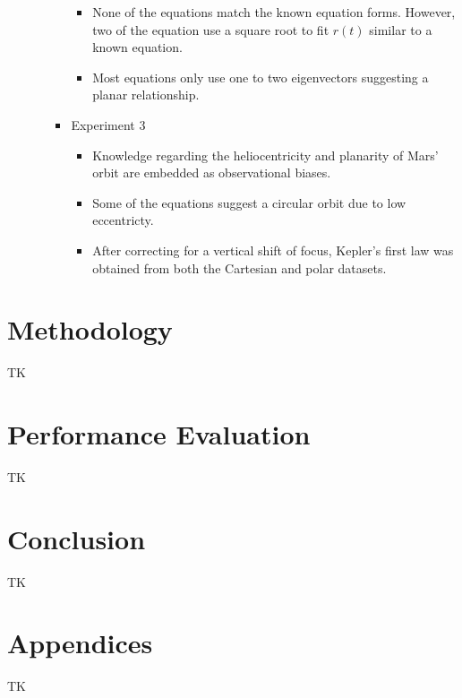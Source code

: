 \documentclass[fleqn,10pt]{olplainarticle}
\begin{document}
\begin{itemize}
\begin{itemize}
\begin{itemize}
\begin {itemize}
                                \item None of the equations match the known equation forms. However, two of the equation use a square root to fit $r(t)$ similar to a known equation.
                                \item Most equations only use one to two eigenvectors suggesting a planar relationship.
                            \end{itemize}
                        \item Experiment 3
                            \begin{itemize}
                                \item Knowledge regarding the heliocentricity and planarity of Mars' orbit are embedded as observational biases.
                                \item Some of the equations suggest a circular orbit due to low eccentricty.
                                \item After correcting for a vertical shift of focus, Kepler's first law was obtained from both the Cartesian and polar datasets. 
                            \end{itemize}
                    \end{itemize}
          \end{itemize}
\end{itemize}

\section{Methodology}
TK

\section{Performance Evaluation}
TK

\section{Conclusion}
TK

\nocite{*}


\section*{Appendices}
TK
\end{document}
